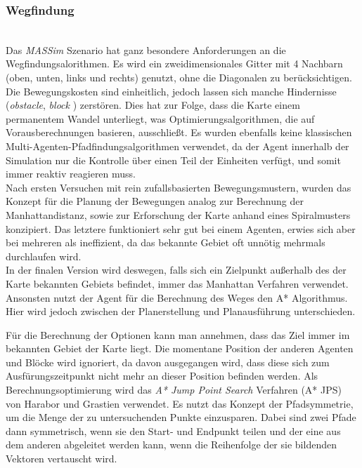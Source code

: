 \subsubsection{Wegfindung} \label{kap:wegfindung} ~\\
Das \textit{MASSim} Szenario hat ganz besondere Anforderungen an die Wegfindungsalorithmen. Es wird ein zweidimensionales Gitter mit 4 Nachbarn (oben, unten, links und rechts) genutzt, ohne die Diagonalen zu berücksichtigen. Die Bewegungskosten sind einheitlich, jedoch lassen sich manche Hindernisse (\textit{obstacle}, \textit{block} ) zerstören. Dies hat zur Folge, dass die Karte einem permanentem Wandel unterliegt, was Optimierungsalgorithmen, die auf Vorausberechnungen basieren, ausschließt. Es wurden ebenfalls keine klassischen Multi-Agenten-Pfadfindungsalgorithmen verwendet, da der Agent innerhalb der Simulation nur die Kontrolle über einen Teil der Einheiten verfügt, und somit immer reaktiv reagieren muss. \\

Nach ersten Versuchen mit rein zufallsbasierten Bewegungsmustern, wurden das Konzept für die Planung der Bewegungen analog zur Berechnung der Manhattandistanz, sowie zur Erforschung der Karte anhand eines Spiralmusters konzipiert. Das letztere funktioniert sehr gut bei einem Agenten, erwies sich aber bei mehreren als ineffizient, da das bekannte Gebiet oft unnötig mehrmals durchlaufen wird.  \\

In der finalen Version wird deswegen, falls sich ein Zielpunkt außerhalb des der Karte bekannten Gebiets befindet, immer das \glqq Manhattan \grqq Verfahren verwendet. Ansonsten nutzt der Agent für die Berechnung des Weges den A* Algorithmus. Hier wird jedoch zwischen der Planerstellung und Planausführung unterschieden. 

Für die Berechnung der Optionen kann man annehmen, dass das Ziel immer im bekannten Gebiet der Karte liegt. Die momentane Position der anderen Agenten und Blöcke wird ignoriert, da davon ausgegangen wird, dass diese sich zum Ausfürungszeitpunkt nicht mehr an dieser Position befinden werden. Als Berechnungsoptimierung wird das \textit{A* Jump Point Search} Verfahren (A* JPS) \cite{ref_proc1} von Harabor und Grastien verwendet. Es nutzt das Konzept der Pfadsymmetrie, um die Menge der zu untersuchenden Punkte einzusparen. Dabei sind zwei Pfade dann symmetrisch, wenn sie den Start- und Endpunkt teilen und der eine aus dem anderen abgeleitet werden kann, wenn die Reihenfolge der sie bildenden Vektoren vertauscht wird. 

